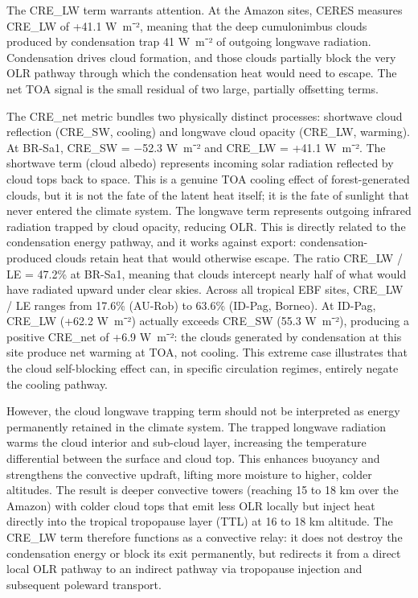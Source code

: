 The CRE\_LW term warrants attention. At the Amazon sites, CERES measures
CRE\_LW of +41.1 W~m⁻², meaning that the deep cumulonimbus clouds
produced by condensation trap 41 W~m⁻² of outgoing longwave radiation.
Condensation drives cloud formation, and those clouds partially block
the very OLR pathway through which the condensation heat would need to
escape. The net TOA signal is the small residual of two large, partially
offsetting terms.

The CRE\_net metric bundles two physically distinct processes: shortwave
cloud reflection (CRE\_SW, cooling) and longwave cloud opacity (CRE\_LW,
warming). At BR-Sa1, CRE\_SW = −52.3 W~m⁻² and CRE\_LW = +41.1 W~m⁻².
The shortwave term (cloud albedo) represents incoming solar radiation
reflected by cloud tops back to space. This is a genuine TOA cooling
effect of forest-generated clouds, but it is not the fate of the latent
heat itself; it is the fate of sunlight that never entered the climate
system. The longwave term represents outgoing infrared radiation trapped
by cloud opacity, reducing OLR. This is directly related to the
condensation energy pathway, and it works against export:
condensation-produced clouds retain heat that would otherwise escape.
The ratio CRE\_LW / LE = 47.2\% at BR-Sa1, meaning that clouds intercept
nearly half of what would have radiated upward under clear skies. Across
all tropical EBF sites, CRE\_LW / LE ranges from 17.6\% (AU-Rob) to
63.6\% (ID-Pag, Borneo). At ID-Pag, CRE\_LW (+62.2 W~m⁻²) actually
exceeds \textbar CRE\_SW\textbar{} (55.3 W~m⁻²), producing a positive
CRE\_net of +6.9 W~m⁻²: the clouds generated by condensation at this
site produce net warming at TOA, not cooling. This extreme case
illustrates that the cloud self-blocking effect can, in specific
circulation regimes, entirely negate the cooling pathway.

However, the cloud longwave trapping term should not be interpreted as
energy permanently retained in the climate system. The trapped longwave
radiation warms the cloud interior and sub-cloud layer, increasing the
temperature differential between the surface and cloud top. This
enhances buoyancy and strengthens the convective updraft, lifting more
moisture to higher, colder altitudes. The result is deeper convective
towers (reaching 15 to 18 km over the Amazon) with colder cloud tops
that emit less OLR locally but inject heat directly into the tropical
tropopause layer (TTL) at 16 to 18 km altitude. The CRE\_LW term
therefore functions as a convective relay: it does not destroy the
condensation energy or block its exit permanently, but redirects it from
a direct local OLR pathway to an indirect pathway via tropopause
injection and subsequent poleward transport.

